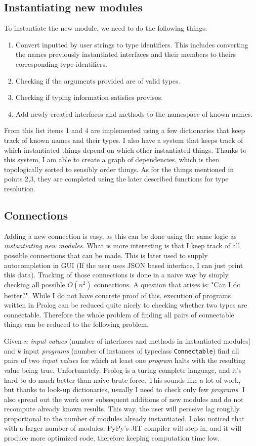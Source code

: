 \documentclass[12pt]{report}
\begin{document}
\subsection{Instantiating new modules} 
To instantiate the new module, we need to do the following things: 
\begin{enumerate} 
   \item Convert inputted by user strings to type identifiers. This includes converting the names previously instantiated interfaces and their members to theirs corresponding type identifiers. 
   \item Checking if the arguments provided are of valid types. 
   \item Checking if typing information satisfies provisos. 
   \item Add newly created interfaces and methods to the namespace of known names. 
\end{enumerate} 
From this list items 1 and 4 are implemented using a few dictionaries that keep track of known names and their types. I also have a system that keeps track of which instantiated things depend on which other instantiated things. Thanks to this system, I am able to create a graph of dependencies, which is then topologically sorted to sensibly order things. As for the things mentioned in points 2,3, they are completed using the later described functions for type resolution. 
\subsection{Connections}
Adding a new connection is easy, as this can be done using the same logic as \emph{instantiating new modules}. What is more interesting is that I keep track of all possible connections that can be made. This is later used to supply autocompletion in GUI (If the user uses JSON based interface, I can just print this data). Tracking of those connections is done in a naive way by simply checking all possible $O(n^2)$ connections. A question that arises is: "Can I do better?". While I do not have concrete proof of this, execution of programs written in Prolog can be reduced quite nicely to checking whether two types are connectable. Therefore the whole problem of finding all pairs of connectable things can be reduced to the following problem.
\par
Given $n$ \emph{input values} (number of interfaces and methods in instantiated modules) and $k$ input \emph{programs} (number of instances of typeclass \verb!Connectable!) find all pairs of two \emph{input values} for which at least one \emph{program} halts with the resulting value being true.
Unfortunately, Prolog is a turing complete language, and it's hard to do much better than naive brute force.
This sounds like a lot of work, but thanks to look-up dictionaries, usually I need to check only few \emph{programs}. I also spread out the work over subsequent additions of new modules and do not recompute already known results. This way, the user will perceive lag roughly proportional to the number of modules already instantiated. I also noticed that with a larger number of modules, PyPy's JIT compiler will step in, and it will produce more optimized code, therefore keeping computation time low. 
 
\end{document}
